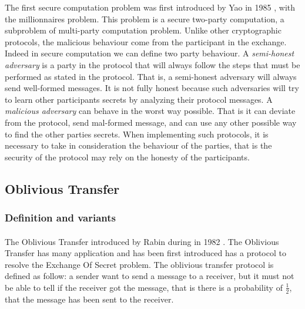 \documentclass[11pt,a4paper]{article}
\begin{document}
The first secure computation problem was first introduced by
Yao in 1985 \cite{yao_protocols_1982}, with the millionnaires problem.
This problem is a secure two-party computation, a subproblem
of multi-party computation problem. Unlike other cryptographic
protocols, the malicious behaviour come from the
participant in the exchange. Indeed in secure computation
we can define two party behaviour. A \textit{semi-honest adversary}
is a party in the protocol that will always follow the steps
that must be performed as stated in the protocol. That is, a semi-honest
adversary will always send well-formed messages. It is not
fully honest because such adversaries will try to learn other
participants secrets by analyzing their protocol messages.
A \textit{malicious adversary} can behave in the worst way possible.
That is it can deviate from the protocol, send mal-formed message,
and can use any other possible way to find the other parties secrets.
When implementing such protocols, it is necessary to take in consideration
the behaviour of the parties, that is the security of the protocol
may rely on the honesty of the participants.

\subsection{Oblivious Transfer}

\subsubsection{Definition and variants}

\paragraph{}


The Oblivious Transfer introduced by Rabin during
in 1982 \cite{rabin_how_nodate}. The Oblivious Transfer has many application
and has been first introduced has a protocol to resolve the Exchange Of
Secret problem.
The oblivious transfer protocol is defined as follow:
a sender want to send a message to a receiver, but it
must not be able to tell if the receiver got the message, that
is there is a probability of $\frac{1}{2}$, that the message
has been sent to the receiver.

\paragraph{}
\end{document}
